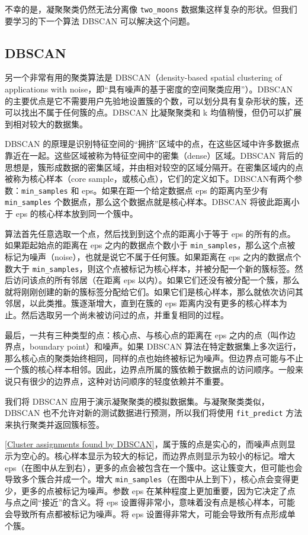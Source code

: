 不幸的是，凝聚聚类仍然无法分离像 \verb|two_moons| 数据集这样复杂的形状。但我们要学习的下一个算法 DBSCAN 可以解决这个问题。
\subsection{DBSCAN}
另一个非常有用的聚类算法是 DBSCAN（density-based spatial clustering of applications with noise，即“具有噪声的基于密度的空间聚类应用”）。DBSCAN 的主要优点是它不需要用户先验地设置簇的个数，可以划分具有复杂形状的簇，还可以找出不属于任何簇的点。DBSCAN 比凝聚聚类和 k 均值稍慢，但仍可以扩展到相对较大的数据集。

DBSCAN 的原理是识别特征空间的“拥挤”区域中的点，在这些区域中许多数据点靠近在一起。这些区域被称为特征空间中的密集（dense）区域。DBSCAN 背后的思想是，簇形成数据的密集区域，并由相对较空的区域分隔开。在密集区域内的点被称为核心样本（core sample，或核心点），它们的定义如下。DBSCAN有两个参数：\verb|min_samples| 和 eps。如果在距一个给定数据点 eps 的距离内至少有 \verb|min_samples| 个数据点，那么这个数据点就是核心样本。DBSCAN 将彼此距离小于 eps 的核心样本放到同一个簇中。

\begin{tcolorbox}
    算法首先任意选取一个点，然后找到到这个点的距离小于等于 eps 的所有的点。如果距起始点的距离在 eps 之内的数据点个数小于 \verb|min_samples|，那么这个点被标记为噪声（noise），也就是说它不属于任何簇。如果距离在 eps 之内的数据点个数大于 \verb|min_samples|，则这个点被标记为核心样本，并被分配一个新的簇标签。然后访问该点的所有邻居（在距离 eps 以内）。如果它们还没有被分配一个簇，那么就将刚刚创建的新的簇标签分配给它们。如果它们是核心样本，那么就依次访问其邻居，以此类推。簇逐渐增大，直到在簇的 eps 距离内没有更多的核心样本为止。然后选取另一个尚未被访问过的点，并重复相同的过程。
\end{tcolorbox}

最后，一共有三种类型的点：核心点、与核心点的距离在 eps 之内的点（叫作边界点，boundary point）和噪声。如果 DBSCAN 算法在特定数据集上多次运行，那么核心点的聚类始终相同，同样的点也始终被标记为噪声。但边界点可能与不止一个簇的核心样本相邻。因此，边界点所属的簇依赖于数据点的访问顺序。一般来说只有很少的边界点，这种对访问顺序的轻度依赖并不重要。

我们将 DBSCAN 应用于演示凝聚聚类的模拟数据集。与凝聚聚类类似，DBSCAN 也不允许对新的测试数据进行预测，所以我们将使用 \verb|fit_predict| 方法来执行聚类并返回簇标签。


\autoref{Cluster assignments found by DBSCAN}，属于簇的点是实心的，而噪声点则显示为空心的。核心样本显示为较大的标记，而边界点则显示为较小的标记。增大 eps（在图中从左到右），更多的点会被包含在一个簇中。这让簇变大，但可能也会导致多个簇合并成一个。增大 \verb|min_samples|（在图中从上到下），核心点会变得更少，更多的点被标记为噪声。参数 eps 在某种程度上更加重要，因为它决定了点与点之间“接近”的含义。将 eps 设置得非常小，意味着没有点是核心样本，可能会导致所有点都被标记为噪声。将 eps 设置得非常大，可能会导致所有点形成单个簇。


